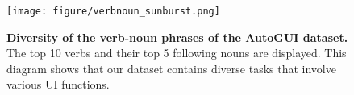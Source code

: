 \begin{figure}[t]
    \centering
    \texttt{[image: figure/verbnoun\_sunburst.png]}
    \caption{\textbf{Diversity of the verb-noun phrases of the AutoGUI dataset.} The top 10 verbs and their top 5 following nouns are displayed. This diagram shows that our dataset contains diverse tasks that involve various UI functions.}
    \label{fig: verbnoun}
\end{figure}